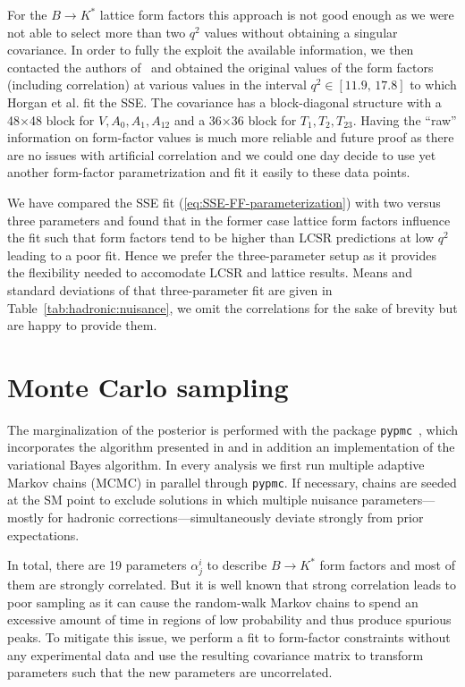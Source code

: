 \documentclass[twocolumn,epjc3]{svjour3}
\numberwithin{equation}{section}
\def \refeq#1{(\ref{#1})}
\def \reftab#1{Table~\ref{#1}}
\newcommand{\checked}[1]{{\color{brown}{ {\bf Checked: }{#1}}}}
\renewcommand{\checked}[1]{#1}
\renewcommand{\[}{\big[}
\renewcommand{\]}{\big]}
\renewcommand{\(}{\big(}
\renewcommand{\)}{\big)}
\begin{document}
For the $B \to K^*$ lattice form factors this approach is not good
enough as we were not able to select more than two $q^2$ values
without obtaining a singular covariance. In order to fully the exploit
the available information, we then contacted the authors
of~\cite{Horgan:2015vla} and obtained the original values of the form
factors (including correlation) at various values in the interval $q^2
\in [11.9,\, 17.8]$ to which Horgan et al. fit the SSE. The covariance
has a block-diagonal structure with a 48$\times$48 block for $V, A_0,
A_1, A_{12}$ and a 36$\times$36 block for $T_1, T_2, T_{23}$. Having
the ``raw'' information on form-factor values is much more reliable
and future proof as there are no issues with artificial correlation
and we could one day decide to use yet another form-factor
parametrization and fit it easily to these data points.

We have compared the SSE fit \refeq{eq:SSE-FF-parameterization} with two versus
three parameters and found that in the former case lattice form factors
influence the fit such that form factors tend to be higher than LCSR predictions
at low $q^2$ leading to a poor fit. Hence we prefer the three-parameter setup as
it provides the flexibility needed to accomodate LCSR and lattice results. Means
and standard {deviations} of that three-parameter fit are given in
\reftab{tab:hadronic:nuisance}, we omit the correlations for the sake of brevity
but are happy to provide them.


\section{\checked{Monte Carlo sampling} \label{app:mc}}

The marginalization of the posterior is performed
with the package {\tt pypmc}~\cite{beaujean_2015_20045}, which incorporates the
algorithm presented in \cite{Beaujean:2013:PMC, Beaujean:2012uj} and in addition
an implementation of the variational Bayes algorithm. In every analysis we first
run multiple adaptive Markov chains (MCMC) in parallel through
\texttt{pypmc}. If necessary, chains are seeded at the SM point to exclude
solutions in which multiple nuisance parameters---mostly for hadronic
corrections---simultaneously deviate strongly from prior expectations.

In total, there are 19 parameters $\alpha^i_j$ to describe $B\to K^*$ form
factors and most of them are strongly correlated. But it is well known that
strong correlation leads to poor sampling as it can cause the random-walk Markov
chains to spend an excessive amount of  time in regions of low probability and
thus produce spurious peaks. To mitigate this issue, we perform a fit to
form-factor constraints without any experimental data and use the resulting
covariance matrix to transform parameters such that the new parameters are
uncorrelated.
\end{document}
